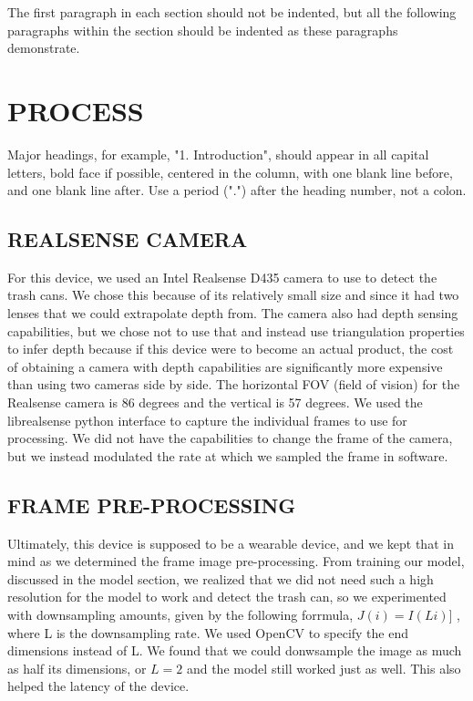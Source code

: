 \documentclass{article}
\begin{document}
The first paragraph in each section should not be indented, but all the
following paragraphs within the section should be indented as these paragraphs
demonstrate.

\section{PROCESS}
\label{sec:theprocess}

Major headings, for example, "1. Introduction", should appear in all capital
letters, bold face if possible, centered in the column, with one blank line
before, and one blank line after. Use a period (".") after the heading number,
not a colon.

\subsection{REALSENSE CAMERA}
\label{ssec:realsense}

For this device, we used an Intel Realsense D435 camera to use to detect the trash cans. We chose this because of its relatively small size and since it had two lenses that we could extrapolate depth from. The camera also had depth sensing capabilities, but we chose not to use that and instead use triangulation properties to infer depth because if this device were to become an actual product, the cost of obtaining a camera with depth capabilities are significantly more expensive than using two cameras side by side. The horizontal FOV (field of vision) for the Realsense camera is 86 degrees and the vertical is 57 degrees. We used the librealsense python interface \cite{realsense} to capture the individual frames to use for processing. We did not have the capabilities to change the frame of the camera, but we instead modulated the rate at which we sampled the frame in software. 

\subsection{FRAME PRE-PROCESSING}
\label{ssec:frprep}

Ultimately, this device is supposed to be a wearable device, and we kept that in mind as we determined the frame image pre-processing. From training our model, discussed in the model section, we realized that we did not need such a high resolution for the model to work and detect the trash can, so we experimented with downsampling amounts, given by the following forrmula, $J(i) = I(Li)]$ \cite{Bovik19}, where L is the downsampling rate. We used OpenCV \cite{opencv_library} to specify the end dimensions instead of L. We found that we could donwsample the image as much as half its dimensions, or $L = 2$ and the model still worked just as well. This also helped the latency of the device. 
\end{document}
